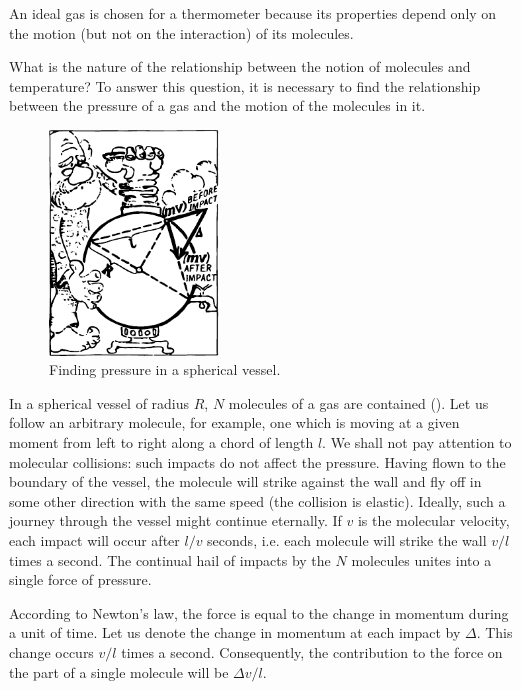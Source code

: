 An ideal gas is chosen for a thermometer because its properties depend only on the motion (but not on the interaction) of its molecules.

What is the nature of the relationship between the notion of molecules and temperature? To answer this ques­tion, it is necessary to find the relationship between the pressure of a gas and the motion of the molecules in it.

\begin{figure}[!ht]
\centering
\includegraphics[width=0.4\textwidth]{figures/fig-03-01.pdf}
\caption{Finding pressure in a spherical vessel.}
\label{fig-3.1}
\end{figure}

In a spherical vessel of radius $R$, $N$ molecules of a gas are contained (). Let us follow an arbitrary molecule, for example, one which is moving at a given moment from left to right along a chord of length $l$. We shall not pay attention to molecular collisions: such impacts do not affect the pressure. Having flown to the boundary of the vessel, the molecule will strike against the wall and fly off in some other direction with the same speed (the collision is elastic). Ideally, such a journey through the vessel might continue eternally. If $v$ is the molecular velocity, each impact will occur after $l/v$ seconds, i.e. each molecule will strike the wall $v/l$ times a second. The continual hail of impacts by the $N$ mole­cules unites into a single force of pressure.

According to Newton’s law, the force is equal to the change in momentum during a unit of time. Let us de­note the change in momentum at each impact by $\Delta$. This change occurs $v/l$ times a second. Consequently, the con­tribution to the force on the part of a single molecule will be $\Delta v/l$.

